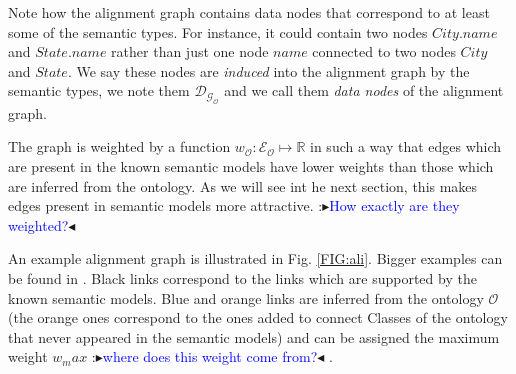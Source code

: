 \documentclass[letterpaper]{article} %
\newcommand{\authornote}[3]{
  {\fbox{\sc 
  #1}:$\blacktriangleright$\textcolor{#2}{\small{#3}}$\blacktriangleleft$}%
}
\newcommand{\ddg}[1]{\authornote{DDG}{blue}{#1}}
\begin{document}
Note how the alignment graph contains data nodes that correspond to at least 
some of the semantic types. For instance, it could contain two nodes 
$City.name$ and $State.name$ rather than just one node $name$ connected to two 
nodes $City$ and $State$. We say these nodes are \emph{induced} into the 
alignment graph by the semantic types, we note them $\mathcal{D_{G_O}}$ and we 
call them \emph{data nodes} of the alignment graph.

The graph is weighted by a function $w_\mathcal{O} : \mathcal{E_O} \mapsto 
\mathbb{R}$ in 
such a way that edges which are present in
the known semantic models have lower weights than those 
which are inferred from the ontology. As we will see int he next section, this 
makes edges present in semantic models more attractive. \ddg{How exactly are 
they weighted?}

An example alignment graph is illustrated in Fig. \ref{FIG:ali}. Bigger 
examples 
can be found in \cite{Taheriyan2013}. Black links 
correspond to the links which are supported by the known semantic models. Blue 
and orange links are inferred from the ontology $\mathcal{O}$ (the orange ones 
correspond to the ones added to connect Classes of the ontology that never 
appeared in the semantic models) and can be assigned the 
maximum weight $w_max$ \ddg{where does this weight come from?} .
\end{document}
